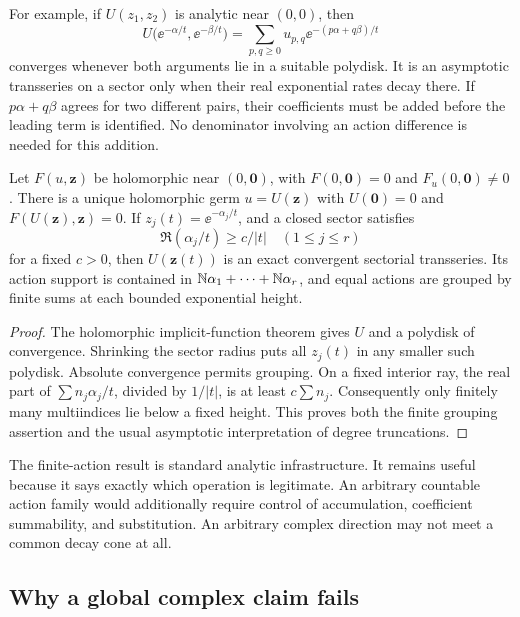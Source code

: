 For example, if \(U(z_1,z_2)\) is analytic near \((0,0)\), then
\[
 U\bigl(\ee^{-\alpha/t},\ee^{-\beta/t}\bigr)
 =\sum_{p,q\ge0}u_{p,q}\ee^{-(p\alpha+q\beta)/t}
\]
converges whenever both arguments lie in a suitable polydisk.
It is an asymptotic transseries on a sector only when their real
exponential rates decay there.  If \(p\alpha+q\beta\) agrees for two
different pairs, their coefficients must be added before the leading
term is identified.  No denominator involving an action difference is
needed for this addition.

\begin{proposition}\label{prop:finite-actions}
Let \(F(u,\mathbf z)\) be holomorphic near \((0,\mathbf0)\), with
\(F(0,\mathbf0)=0\) and \(F_u(0,\mathbf0)\ne0\).  There is a unique
holomorphic germ \(u=U(\mathbf z)\) with \(U(\mathbf0)=0\) and
\(F(U(\mathbf z),\mathbf z)=0\).
If \(z_j(t)=\ee^{-\alpha_j/t}\), and a closed sector satisfies
\[
 \Re(\alpha_j/t)\ge c/|t| \quad (1\le j\le r)
\]
for a fixed \(c>0\), then \(U(\mathbf z(t))\) is an exact convergent
sectorial transseries.  Its action support is contained in
\(\mathbb N\alpha_1+\cdots+\mathbb N\alpha_r\), and equal actions are grouped by
finite sums at each bounded exponential height.
\end{proposition}
\begin{proof}
The holomorphic implicit-function theorem gives \(U\) and a polydisk
of convergence.  Shrinking the sector radius puts all \(z_j(t)\)
in any smaller such polydisk.  Absolute convergence permits grouping.
On a fixed interior ray, the real part of
\(\sum n_j\alpha_j/t\), divided by \(1/|t|\), is at least
\(c\sum n_j\).  Consequently only finitely many multiindices lie below
a fixed height.  This proves both the finite grouping assertion and
the usual asymptotic interpretation of degree truncations.
\end{proof}

The finite-action result is standard analytic infrastructure.  It remains
useful because it says exactly which operation is legitimate.  An
arbitrary countable action family would additionally require control of
accumulation, coefficient summability, and substitution.  An arbitrary
complex direction may not meet a common decay cone at all.

\subsection{Why a global complex claim fails}

